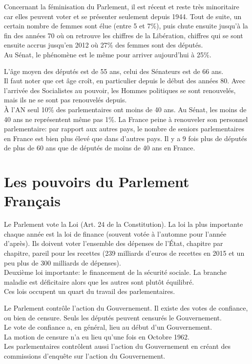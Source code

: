 \documentclass[12pt, a4paper, openany]{book}
\begin{document}
Concernant la féminisation du Parlement, il est récent et reste très minoritaire car elles peuvent voter et se présenter seulement depuis 1944. Tout de suite, un certain nombre de femmes sont élue (entre 5 et 7\%), puis chute ensuite jusqu'à la fin des années 70 où on retrouve les chiffres de la Libération, chiffres qui se sont ensuite accrus jusqu'en 2012 où 27\% des femmes sont des députés. \\
Au Sénat, le phénomène est le même pour arriver aujourd'hui à 25\%. 


L'âge moyen des députés est de 55 ans, celui des Sénateurs est de 66 ans. \\
Il faut noter que cet âge croît, en particulier depuis le début des années 80. Avec l'arrivée des Socialistes au pouvoir, les Hommes politiques se sont renouvelés, mais ils ne se sont pas renouvelés depuis. \\
À l'AN seul 10\% des parlementaires ont moins de 40 ans. Au Sénat, les moins de 40 ans ne représentent même pas 1\%. La France peine à renouveler son personnel parlementaire: par rapport aux autres pays, le nombre de seniors parlementaires en France est bien plus élevé que dans d'autres pays. Il y a 9 fois plus de députés de plus de 60 ans que de députés de moins de 40 ans en France. 

\section{Les pouvoirs du Parlement Français}

Le Parlement vote la Loi (Art. 24 de la Constitution). La loi la plus importante chaque année est la loi de finance (souvent votée à l'automne pour l'année d'après). Ils doivent voter l'ensemble des dépenses de l'État, chapitre par chapitre, pareil pour les recettes (239 milliards d'euros de recettes en 2015 et un peu plus de 300 milliards de dépenses). \\
Deuxième loi importante: le financement de la sécurité sociale. La branche maladie est déficitaire alors que les autres sont plutôt équilibré. \\
Ces lois occupent un quart du travail des parlementaires. 


Le Parlement contrôle l'action du Gouvernement. Il existe des votes de confiance, ou bien de censure. Seuls les députés peuvent censurés le Gouvernement. \\
Le vote de confiance a, en général, lieu au début d'un Gouvernement. \\
La motion de censure n'a eu lieu qu'une fois en Octobre 1962. \\
Les parlementaires contrôlent aussi l'action du Gouvernement en créant des commissions d'enquête sur l'action du Gouvernement. 
\end{document}
